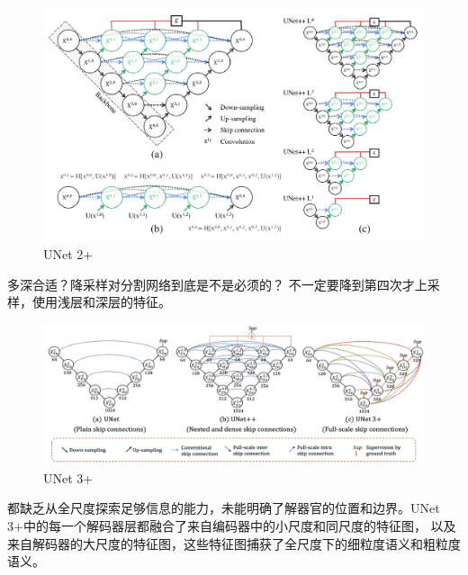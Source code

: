 \begin{figure}[H]
    \centering
    \includegraphics[width=14cm]{images/unet2+.png}
    \caption{UNet 2+}
    \label{fig:unet2p}
\end{figure}

多深合适？降采样对分割网络到底是不是必须的？
不一定要降到第四次才上采样，使用浅层和深层的特征。

\begin{figure}[H]
    \centering
    \includegraphics[width=14cm]{images/unet3+.png}
    \caption{UNet 3+}
    \label{fig:unet3p}
\end{figure}
都缺乏从全尺度探索足够信息的能力，未能明确了解器官的位置和边界。UNet 3+中的每一个解码器层都融合了来自编码器中的小尺度和同尺度的特征图，
以及来自解码器的大尺度的特征图，这些特征图捕获了全尺度下的细粒度语义和粗粒度语义。
